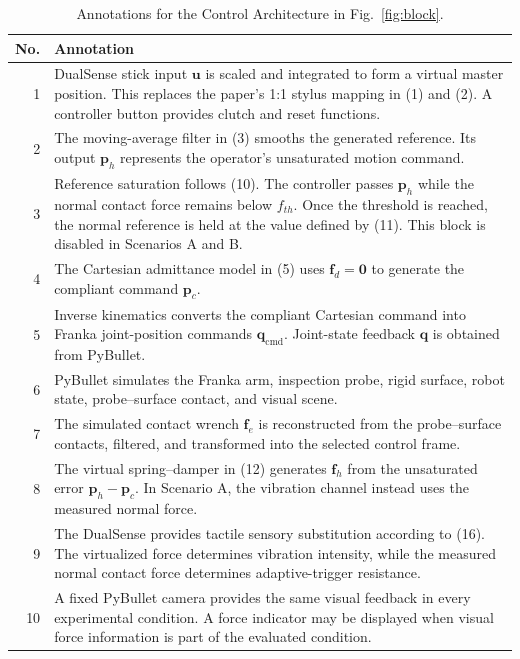 \documentclass[journal]{IEEEtran}
\newcommand{\p}{\bm{p}}
\newcommand{\f}{\bm{f}}
\begin{document}
\begin{table}[!t]
\caption{Annotations for the Control Architecture in Fig.~\ref{fig:block}.}
\label{tab:annot}
\centering\small
\begin{tabularx}{\textwidth}{@{}r X@{}}
\toprule
No. & Annotation\\
\midrule
1 & DualSense stick input $\bm{u}$ is scaled and integrated to form a virtual master position. This replaces the paper's 1:1 stylus mapping in (1) and (2). A controller button provides clutch and reset functions.\\
2 & The moving-average filter in (3) smooths the generated reference. Its output $\p_h$ represents the operator's unsaturated motion command.\\
3 & Reference saturation follows (10). The controller passes $\p_h$ while the normal contact force remains below $f_{th}$. Once the threshold is reached, the normal reference is held at the value defined by (11). This block is disabled in Scenarios A and B.\\
4 & The Cartesian admittance model in (5) uses $\f_d=\bm{0}$ to generate the compliant command $\p_c$.\\
5 & Inverse kinematics converts the compliant Cartesian command into Franka joint-position commands $\bm{q}_{\mathrm{cmd}}$. Joint-state feedback $\bm{q}$ is obtained from PyBullet.\\
6 & PyBullet simulates the Franka arm, inspection probe, rigid surface, robot state, probe--surface contact, and visual scene.\\
7 & The simulated contact wrench $\f_e$ is reconstructed from the probe--surface contacts, filtered, and transformed into the selected control frame.\\
8 & The virtual spring--damper in (12) generates $\f_h$ from the unsaturated error $\p_h-\p_c$. In Scenario A, the vibration channel instead uses the measured normal force.\\
9 & The DualSense provides tactile sensory substitution according to (16). The virtualized force determines vibration intensity, while the measured normal contact force determines adaptive-trigger resistance.\\
10 & A fixed PyBullet camera provides the same visual feedback in every experimental condition. A force indicator may be displayed when visual force information is part of the evaluated condition.\\
\bottomrule
\end{tabularx}
\end{table}
\end{document}
